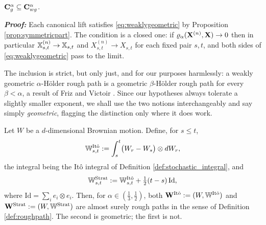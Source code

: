 \begin{proposition}\label{prop:geometricinclusion}
$\mathbf{C}_{g}^{\alpha} \subseteq \mathbf{C}_{wg}^{\alpha}$.
\end{proposition}

\textbf{\textit{Proof:}} Each canonical lift satisfies \eqref{eq:weaklygeometric} by Proposition
\ref{prop:symmetricpart}. The condition is a closed one: if $\varrho_{\alpha}(\mathbf{X}^{(n)},\mathbf{X})\to0$ then in
particular $\mathbb{X}^{(n)}_{s,t}\to\mathbb{X}_{s,t}$ and $X^{(n)}_{s,t}\to X_{s,t}$ for each fixed pair $s,t$,
and both sides of \eqref{eq:weaklygeometric} pass to the limit. \qedfilledtext

\medskip

The inclusion is strict, but only just, and for our purposes harmlessly: a weakly geometric
$\alpha$-Hölder rough path is a geometric $\beta$-Hölder rough path for every $\beta<\alpha$, a
result of Friz and Victoir \cite[Ch.\ 8]{frizvictoir2010}. Since our hypotheses always tolerate a
slightly smaller exponent, we shall use the two notions interchangeably and say simply
\emph{geometric}, flagging the distinction only where it does work.


\begin{example}\label{ex:brownianroughpath}
Let $W$ be a $d$-dimensional Brownian motion. Define, for $s\leq t$,
\begin{equation}\label{eq:itolift}
\mathbb{W}^{\mathrm{It\hat o}}_{s,t} := \int_s^t \bigl(W_r - W_s\bigr)\otimes d W_r ,
\end{equation}
the integral being the Itô integral of Definition \ref{def:stochastic_integral}, and
\begin{equation}\label{eq:stratlift}
\mathbb{W}^{\mathrm{Strat}}_{s,t} := \mathbb{W}^{\mathrm{It\hat o}}_{s,t} + \tfrac12 (t-s)\,\mathrm{Id},
\end{equation}
where $\mathrm{Id} = \sum_i e_i \otimes e_i$. Then, for $\alpha \in (\tfrac13,\tfrac12)$, both
$\mathbf{W}^{\mathrm{It\hat o}} := (W,\mathbb{W}^{\mathrm{It\hat o}})$ and
$\mathbf{W}^{\mathrm{Strat}} := (W,\mathbb{W}^{\mathrm{Strat}})$ are almost surely rough paths in the
sense of Definition \ref{def:roughpath}. The second is geometric; the first is not.
\end{example}

